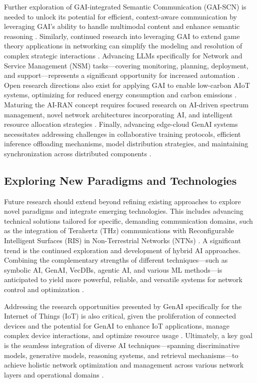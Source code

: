 \documentclass[sigconf]{acmart}
\begin{document}
Further exploration of GAI-integrated Semantic Communication (GAI-SCN) is needed to unlock its potential for efficient, context-aware communication by leveraging GAI's ability to handle multimodal content and enhance semantic reasoning \cite{ref23}. Similarly, continued research into leveraging GAI to extend game theory applications in networking can simplify the modeling and resolution of complex strategic interactions \cite{ref21}. Advancing LLMs specifically for Network and Service Management (NSM) tasks—covering monitoring, planning, deployment, and support—represents a significant opportunity for increased automation \cite{ref25}. Open research directions also exist for applying GAI to enable low-carbon AIoT systems, optimizing for reduced energy consumption and carbon emissions \cite{ref29}. Maturing the AI-RAN concept requires focused research on AI-driven spectrum management, novel network architectures incorporating AI, and intelligent resource allocation strategies \cite{ref34}. Finally, advancing edge-cloud GenAI systems necessitates addressing challenges in collaborative training protocols, efficient inference offloading mechanisms, model distribution strategies, and maintaining synchronization across distributed components \cite{ref3, ref14, ref31}.

\subsection{Exploring New Paradigms and Technologies}

Future research should extend beyond refining existing approaches to explore novel paradigms and integrate emerging technologies. This includes advancing technical solutions tailored for specific, demanding communication domains, such as the integration of Terahertz (THz) communications with Reconfigurable Intelligent Surfaces (RIS) in Non-Terrestrial Networks (NTNs) \cite{ref10}. A significant trend is the continued exploration and development of hybrid AI approaches. Combining the complementary strengths of different techniques—such as symbolic AI, GenAI, VecDBs, agentic AI, and various ML methods—is anticipated to yield more powerful, reliable, and versatile systems for network control and optimization \cite{ref6, ref8, ref20, ref21, ref23, ref25, ref29, ref35}.

Addressing the research opportunities presented by GenAI specifically for the Internet of Things (IoT) is also critical, given the proliferation of connected devices and the potential for GenAI to enhance IoT applications, manage complex device interactions, and optimize resource usage \cite{ref15, ref26, ref29}. Ultimately, a key goal is the seamless integration of diverse AI techniques—spanning discriminative models, generative models, reasoning systems, and retrieval mechanisms—to achieve holistic network optimization and management across various network layers and operational domains \cite{ref31, ref34, ref35}.
\end{document}
